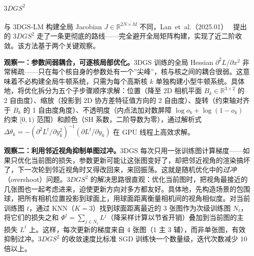 \paragraph{$3DGS^2$}
与 3DGS-LM 构建全局 Jacobian $J \in \mathbb{R}^{2N \times M}$ 不同，Lan~et~al.（2025.01）~\cite{2501_13975} 提出的 $3DGS^2$ 走了一条更彻底的路线——完全避开全局矩阵构建，实现了近二阶收敛。该方法基于两个关键观察。

\textbf{观察一：参数间弱耦合，可逐核局部优化。}3DGS 训练的全局 Hessian $\partial^2 L / \partial x^2$ 非常稀疏——只在每个核自身的参数处有一个”尖峰”，核与核之间的耦合很弱。这意味着不必构建全局牛顿系统，只需为每个高斯核 $k$ 单独构建小型牛顿系统。具体地，将优化拆分为五个子步骤顺序求解：位置（降至 2D 相机平面 $B_k \in \mathbb{R}^{3 \times 2}$ 的 2 自由度）、缩放（投影到 2D 协方差特征值方向的 2 自由度）、旋转（约束轴对齐于 $B_k$ 的 1 自由度角度）、不透明度（内点法加对数屏障 $\log o_k + \log(1-o_k)$ 约束 $[0,1)$ 范围）和颜色（SH 系数，二阶导数为零），通过解析式 $\Delta\theta_k = -(\partial^2 L^t / \partial y_k^2)^{-1}(\partial L^t / \partial y_k)$ 在 GPU 线程上高效求解。

\textbf{观察二：利用邻近视角抑制单图过冲。}3DGS 每次只用一张训练图计算梯度——如果只优化当前图的损失，参数更新可能让这张图变好了，却把邻近视角的渲染搞坏了，下一次轮到邻近视角时又得改回来，来回振荡。这就是随机优化中的\emph{过冲}（overshoot）问题。$3DGS^2$ 的解决思路很直观：优化当前图时，把视角最接近的几张图也一起考虑进来，迫使更新方向对多方都友好。具体地，先构造场景的包围球，把所有相机位置投影到球面上，用球面距离衡量相机间的视角相似度。对当前训练图 $t$，通过 KNN（$K=3$）找到球面距离最近的 3 张图作为次级训练图 $N_t$，将它们的损失之和 $\Phi^t = \sum_{j \in N_t} L^j$（降采样计算以节省开销）叠加到当前图的主损失 $L^t$ 上。这样，每次更新的梯度来自 4 张图（1 主 3 辅），而非单张图，有效抑制过冲。$3DGS^2$ 的收敛速度比标准 SGD 训练快一个数量级，迭代次数减少 10 倍以上。

